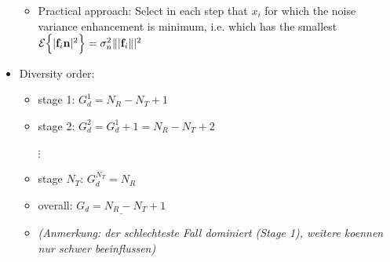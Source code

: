 \documentclass[a4paper, 10pt]{article}
\begin{document}
\begin{itemize}
\begin{itemize}
		\item Practical approach: Select in each step that $x_i $ for which the noise variance enhancement is minimum, i.e. which has the smallest $\mathcal{E}\Bigl\{|\mathbf{f}_i\mathbf{n}|^2\Bigr\} = \sigma _n^2\||\mathbf{f}_i\||^2 $ 
	\end{itemize}
	\item Diversity order:
	\begin{itemize}
		\item stage 1: $G_d^1 = N_R - N_T + 1 $
		\item stage 2: $G_d^2 = G_d^1 + 1 = N_R - N_T +2 $
		\item[ $\vdots$]
		\item stage $N_T$: $G_d^{N_T} = N_R $
		\item overall: $\underline{G_d = N_R - N_T +1} $
		\item \textit{(Anmerkung: der schlechteste Fall dominiert (Stage 1), weitere koennen nur schwer beeinflussen)}
	\end{itemize}
\end{itemize}
\end{document}
